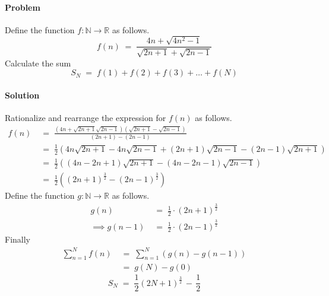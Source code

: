 \documentclass[a4paper, 11pt, reqno]{article}
\newcounter{prob}
\def\problem{\stepcounter{prob}\paragraph{Problem \arabic{prob}}}
\def\solution{\paragraph{Solution}}
\begin{document}
	\problem Define the function $f : \mathbb{N} \to \mathbb{R}$ as follows.
	\begin{equation*}
		f(n) \; = \;  \frac{4n + \sqrt{4n^2 - 1}}{\sqrt{2n+1} + \sqrt{2n-1}} 
	\end{equation*}
	Calculate the sum
	\begin{equation*}
		S_N \; = \; f(1) + f(2) + f(3) + \dots + f(N)
	\end{equation*}
	\solution
	Rationalize and rearrange the expression for $f(n)$ as follows.
	\begin{align*}
		f(n)	\; &= \;  \frac{(4n + \sqrt{2n+1}\sqrt{2n-1})(\sqrt{2n+1} - \sqrt{2n-1})}{(2n + 1) - (2n - 1)} 	\\
			\; &= \;  \frac{1}{2} \left(4n \sqrt{2n+1} - 4n \sqrt{2n-1} + (2n + 1)\sqrt{2n-1} - (2n - 1)\sqrt{2n+1}\right)	\\
			\; &= \;  \frac{1}{2} \left((4n - 2n + 1)\sqrt{2n+1} - (4n - 2n - 1)\sqrt{2n-1}\right) \\
			\; &= \;  \frac{1}{2} \left((2n + 1)^\frac{3}{2} - (2n - 1)^\frac{3}{2}\right)
	\end{align*}
	Define the function $g : \mathbb{N} \to \mathbb{R}$ as follows.
	\begin{align*}
		g(n)	\; &= \;  \frac{1}{2}\cdot (2n + 1)^\frac{3}{2}	\\
		\implies
		g(n - 1)\; &= \;  \frac{1}{2}\cdot (2n - 1)^\frac{3}{2}
	\end{align*}
	Finally
	\begin{align*}
		\sum_{n=1}^{N} f(n) \; &= \;  \sum_{n=1}^{N} \left( g(n) - g(n-1) \right) \\
			\; &= \; g(N) - g(0) 
	\end{align*}
	\begin{equation*}
		\boxed{ S_N \; = \; \frac{1}{2} (2N + 1)^\frac{3}{2} \,-\, \frac{1}{2}}
	\end{equation*}
\end{document}
